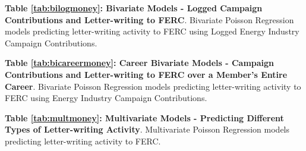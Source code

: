 \begin{table}[ht!]
    \centering
    
  \caption{\textbf{Table \ref{tab:bilogmoney}: Bivariate Models - Logged Campaign Contributions and Letter-writing to FERC}. Bivariate Poisson Regression models predicting letter-writing activity to FERC using Logged Energy Industry Campaign Contributions.}\label{tab:bilogmoney}
\end{table}



\begin{table}[ht!]
    \centering
 
  \caption{\textbf{Table \ref{tab:bicareermoney}: Career Bivariate Models - Campaign Contributions and Letter-writing to FERC over a Member's Entire Career}. Bivariate Poisson Regression models predicting letter-writing activity to FERC using Energy Industry Campaign Contributions.}\label{tab:bicareermoney}
\end{table}

%

\begin{table}
    \centering

  \caption{\textbf{Table \ref{tab:multmoney}: Multivariate Models - Predicting Different Types of Letter-writing Activity}. Multivariate Poisson Regression models predicting letter-writing activity to FERC.}\label{tab:multmoney}
\end{table}









